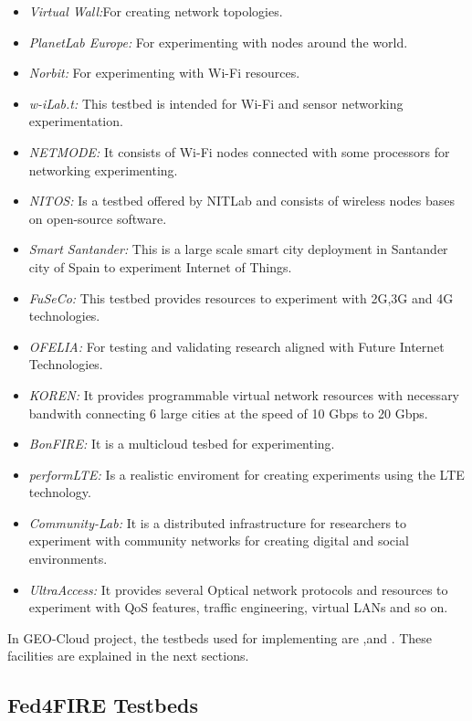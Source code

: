 \begin{itemize}
\begin{itemize}
\item \emph{Virtual Wall:}For creating network topologies. 
\item \emph{PlanetLab Europe:} For experimenting with nodes around the world.
\item \emph{Norbit:} For experimenting with Wi-Fi resources.
\item \emph{w-iLab.t:} This testbed is intended for Wi-Fi and sensor networking experimentation.
\item \emph{NETMODE:} It consists of Wi-Fi nodes connected with some processors
  for networking experimenting.
\item \emph{NITOS:} Is a testbed offered by NITLab and consists of wireless
  nodes bases on open-source software. 
\item \emph{Smart Santander:} This is a large scale smart city deployment in
  Santander city of Spain to experiment Internet of Things. 
\item \emph{FuSeCo:} This testbed provides resources to experiment with 2G,3G
  and 4G technologies.
\item \emph{OFELIA:} For testing and validating research aligned
  with Future Internet Technologies.
\item \emph{KOREN:} It provides programmable virtual network resources with
  necessary bandwith connecting 6 large cities at the speed of 10 Gbps to 20 Gbps. 
\item \emph{BonFIRE:} It is a multicloud tesbed for experimenting.
\item \emph{performLTE:} Is a realistic enviroment for creating experiments
  using the LTE technology.
\item \emph{Community-Lab:} It is a distributed infrastructure for researchers
  to experiment with community networks for creating digital and social environments.
\item \emph{UltraAccess:} It provides several Optical network protocols and
  resources to experiment with \ac{QoS} features, traffic engineering, virtual LANs
  and so on.
\end{itemize}
\end{itemize}

In GEO-Cloud project, the testbeds used for implementing are \vw,\pl and
\bonfire. These facilities are explained in the next sections.

\subsection{Fed4FIRE Testbeds}

